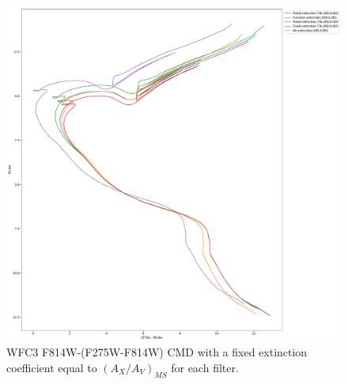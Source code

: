 \documentclass[12pt, a4paper]{report}
\begin{document}
\begin{figure}[h]
\begin{center}
\includegraphics[scale=0.25]{../basti_isochrones_10_13Gyr/Extinction_T5k_FeH0fix_func_f814w_f275wmf814w_500_400_600_Myr_FeH_0p002_ref_noext_Av_1p0.pdf}
\caption{WFC3 F814W-(F275W-F814W) CMD with a fixed extinction coefficient equal to $(A_{X}/A_{V})_{MS}$ for each filter.}
\label{wfc3_isoc2_T5k}
\end{center}
\end{figure}
\end{document}
